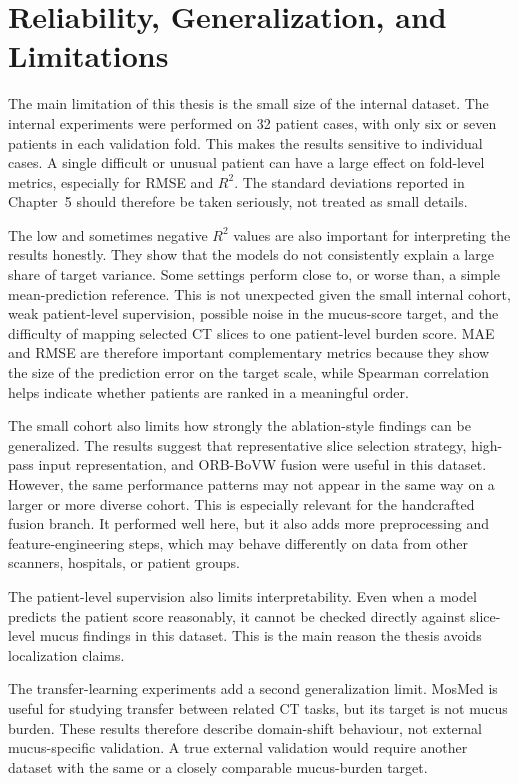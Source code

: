 \section{Reliability, Generalization, and Limitations}
The main limitation of this thesis is the small size of the internal dataset. The internal experiments were performed on 32 patient cases, with only six or seven patients in each validation fold. This makes the results sensitive to individual cases. A single difficult or unusual patient can have a large effect on fold-level metrics, especially for RMSE and \(R^2\). The standard deviations reported in Chapter~5 should therefore be taken seriously, not treated as small details.

The low and sometimes negative \(R^2\) values are also important for interpreting the results honestly. They show that the models do not consistently explain a large share of target variance. Some settings perform close to, or worse than, a simple mean-prediction reference. This is not unexpected given the small internal cohort, weak patient-level supervision, possible noise in the mucus-score target, and the difficulty of mapping selected CT slices to one patient-level burden score. MAE and RMSE are therefore important complementary metrics because they show the size of the prediction error on the target scale, while Spearman correlation helps indicate whether patients are ranked in a meaningful order.

The small cohort also limits how strongly the ablation-style findings can be generalized. The results suggest that representative slice selection strategy, high-pass input representation, and ORB-BoVW fusion were useful in this dataset. However, the same performance patterns may not appear in the same way on a larger or more diverse cohort. This is especially relevant for the handcrafted fusion branch. It performed well here, but it also adds more preprocessing and feature-engineering steps, which may behave differently on data from other scanners, hospitals, or patient groups.

The patient-level supervision also limits interpretability. Even when a model predicts the patient score reasonably, it cannot be checked directly against slice-level mucus findings in this dataset. This is the main reason the thesis avoids localization claims.

The transfer-learning experiments add a second generalization limit. MosMed is useful for studying transfer between related CT tasks, but its target is not mucus burden. These results therefore describe domain-shift behaviour, not external mucus-specific validation. A true external validation would require another dataset with the same or a closely comparable mucus-burden target.

